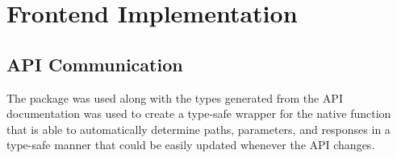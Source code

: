 \section{Frontend Implementation}



\subsection{API Communication}
The  package was used along with the types generated from the API documentation was
used to create a type-safe wrapper for the native  function that is able to automatically
determine paths, parameters, and responses in a type-safe manner that could be easily updated whenever the API
changes.

